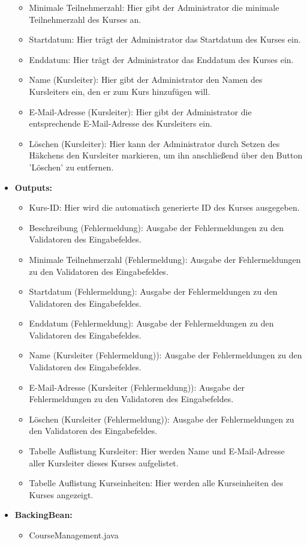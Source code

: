 \begin{itemize}
\begin{itemize}
								\item Minimale Teilnehmerzahl: Hier gibt der Administrator die minimale Teilnehmerzahl des Kurses an.
								\item Startdatum: Hier trägt der Administrator das Startdatum des Kurses ein.
								\item Enddatum: Hier trägt der Administrator das Enddatum des Kurses ein.
								\item Name (Kursleiter): Hier gibt der Administrator den Namen des Kursleiters ein, den er zum Kurs hinzufügen will.
								\item E-Mail-Adresse (Kursleiter): Hier gibt der Administrator die entsprechende E-Mail-Adresse des Kursleiters ein.
								\item Löschen (Kursleiter): Hier kann der Administrator durch Setzen des Häkchens den Kursleiter markieren, um ihn anschließend über den Button 'Löschen' zu entfernen.
							\end{itemize}
						\item \textbf{Outputs:}
							\begin{itemize}
								\item Kurs-ID: Hier wird die automatisch generierte ID des Kurses ausgegeben.
								\item Beschreibung (Fehlermeldung): Ausgabe der Fehlermeldungen zu den Validatoren des Eingabefeldes.
								\item Minimale Teilnehmerzahl (Fehlermeldung): Ausgabe der Fehlermeldungen zu den Validatoren des Eingabefeldes.
								\item Startdatum (Fehlermeldung): Ausgabe der Fehlermeldungen zu den Validatoren des Eingabefeldes.
								\item Enddatum (Fehlermeldung): Ausgabe der Fehlermeldungen zu den Validatoren des Eingabefeldes.
								\item Name (Kursleiter (Fehlermeldung)): Ausgabe der Fehlermeldungen zu den Validatoren des Eingabefeldes.
								\item E-Mail-Adresse (Kursleiter (Fehlermeldung)): Ausgabe der Fehlermeldungen zu den Validatoren des Eingabefeldes.
								\item Löschen (Kursleiter (Fehlermeldung)): Ausgabe der Fehlermeldungen zu den Validatoren des Eingabefeldes.
								\item Tabelle Auflistung Kursleiter: Hier werden Name und E-Mail-Adresse aller Kursleiter dieses Kurses aufgelistet.
								\item Tabelle Auflistung Kurseinheiten: Hier werden alle Kurseinheiten des Kurses angezeigt.
							\end{itemize}
						\item \textbf{BackingBean:}
							\begin{itemize}
								\item CourseManagement.java
							\end{itemize}
					\end{itemize}
				
